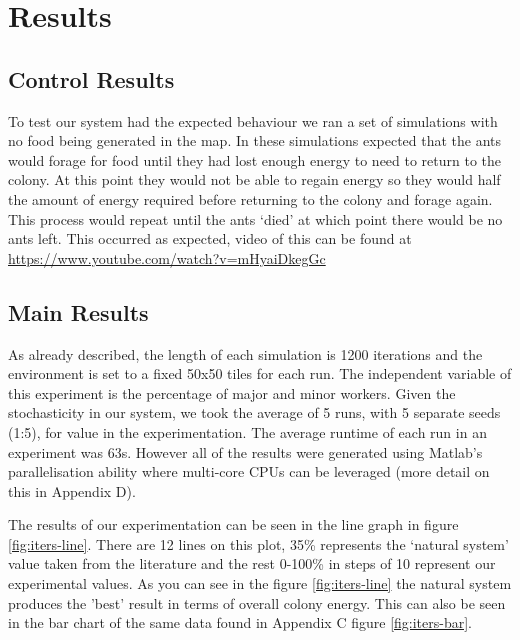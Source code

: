 \section{Results}
\subsection{Control Results}
To test our system had the expected behaviour we ran a set of simulations with no food being generated in the map. In these simulations expected that the ants would forage for food until they had lost enough energy to need to return to the colony. At this point they would not be able to regain energy so they would half the amount of energy required before returning to the colony and forage again. This process would repeat until the ants `died' at which point there would be no ants left. This occurred as expected, video of this can be found at \url{https://www.youtube.com/watch?v=mHyaiDkegGc}

\subsection{Main Results}

As already described, the length of each simulation is 1200 iterations and the environment is set to a fixed 50x50 tiles for each run. The independent variable of this experiment is the percentage of major and minor workers. Given the stochasticity in our system, we took the average of 5 runs, with 5 separate seeds (1:5), for value in the experimentation. The average runtime of each run in an experiment was 63\si{s}. However all of the results were generated using Matlab's parallelisation ability where multi-core CPUs can be leveraged (more detail on this in Appendix D).\par
The results of our experimentation can be seen in the line graph in figure \ref{fig:iters-line}. There are 12 lines on this plot, 35\% represents the `natural system' value taken from the literature \cite{Tschinkel1988} and the rest 0-100\% in steps of 10 represent our experimental values. As you can see in the figure \ref{fig:iters-line} the natural system produces the 'best' result in terms of overall colony energy. This can also be seen in the bar chart of the same data found in Appendix C figure \ref{fig:iters-bar}.\par

